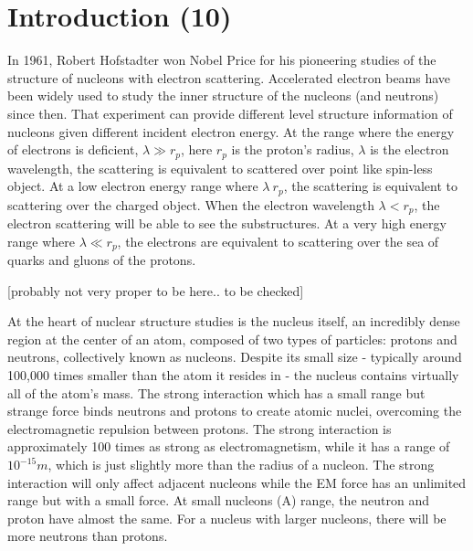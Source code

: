 \chapter{Introduction (10)}

In 1961, Robert Hofstadter won Nobel Price for his pioneering studies of the structure of nucleons with electron scattering. Accelerated electron beams have been widely used to study the inner structure of the nucleons (and neutrons) since then. That experiment can provide different level structure information of nucleons given different incident electron energy. At the range where the energy of electrons is deficient, $\lambda \gg r_p$, here $r_p$ is the proton's radius, $\lambda$ is the electron wavelength, the scattering is equivalent to scattered over point like spin-less object. At a low electron energy range where $\lambda ~r_p$, the scattering is equivalent to scattering over the charged object. When the electron wavelength $\lambda < r_p$, the electron scattering will be able to see the substructures. At a very high energy range where $\lambda \ll r_p$, the electrons are equivalent to scattering over the sea of quarks and gluons of the protons. 

[probably not very proper to be here.. to be checked]

At the heart of nuclear structure studies is the nucleus itself, an incredibly dense region at the center of an atom, composed of two types of particles: protons and neutrons, collectively known as nucleons. Despite its small size - typically around 100,000 times smaller than the atom it resides in - the nucleus contains virtually all of the atom's mass. The strong interaction which has a small range but strange force binds neutrons and protons to create atomic nuclei, overcoming the electromagnetic repulsion between protons. The strong interaction is approximately 100 times as strong as electromagnetism, while it has a range of $10^{-15}m$, which is just slightly more than the radius of a nucleon. The strong interaction will only affect adjacent nucleons while the EM force has an unlimited range but with a small force. At small nucleons (A) range, the neutron and proton have almost the same. For a nucleus with larger nucleons, there will be more neutrons than protons. 

